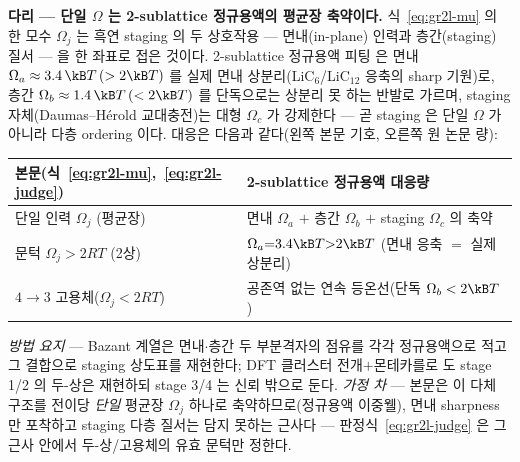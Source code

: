 \begin{srcbox}
\textbf{다리 --- 단일 $\Omega$ 는 2-sublattice 정규용액의 평균장 축약이다.} 식~\eqref{eq:gr2l-mu} 의 한 모수
$\Omega_j$ 는 흑연 staging 의 두 상호작용 --- 면내(in-plane) 인력과 층간(staging) 질서 --- 을 한 좌표로
접은 것이다. 2-sublattice 정규용액 피팅\cite{fergusonbazant2014,guo2016} 은 면내 $\Omega_a\approx3.4\,\kB
T\,(>2\kB T)$ 를 실제 면내 상분리(LiC$_6$/LiC$_{12}$ 응축의 sharp 기원)로, 층간 $\Omega_b\approx1.4\,\kB
T\,(<2\kB T)$ 를 단독으로는 상분리 못 하는 반발로 가르며, staging 자체(Daumas--H\'erold 교대충전)는 대형
$\Omega_c$ 가 강제한다 --- 곧 staging 은 단일 $\Omega$ 가 아니라 다층 ordering 이다. 대응은 다음과 같다(왼쪽
본문 기호, 오른쪽 원 논문 량):
\begin{center}\footnotesize
\begin{tabular}{@{}ll@{}}
\hline
본문(식~\eqref{eq:gr2l-mu},~\eqref{eq:gr2l-judge}) & 2-sublattice 정규용액\cite{fergusonbazant2014,guo2016} 대응량 \\
\hline
단일 인력 $\Omega_j$ (평균장) & 면내 $\Omega_a$ $+$ 층간 $\Omega_b$ $+$ staging $\Omega_c$ 의 축약 \\
문턱 $\Omega_j>2RT$ (2상) & $\Omega_a{=}3.4\kB T{>}2\kB T$ (면내 응축 $=$ 실제 상분리) \\
$4\!\to\!3$ 고용체($\Omega_j<2RT$) & 공존역 없는 연속 등온선(단독 $\Omega_b<2\kB T$) \\
\hline
\end{tabular}
\end{center}
\emph{방법 요지} --- Bazant 계열은 면내$\cdot$층간 두 부분격자의 점유를 각각 정규용액으로 적고 그 결합으로
staging 상도표를 재현한다; DFT 클러스터 전개$+$몬테카를로\cite{persson2010b} 도 stage 1/2 의 두-상은
재현하되 stage 3/4 는 신뢰 밖으로 둔다. \emph{가정 차} --- 본문은 이 다체 구조를 전이당 \emph{단일} 평균장
$\Omega_j$ 하나로 축약하므로(정규용액 이중웰), 면내 sharpness 만 포착하고 staging 다층 질서는 담지 못하는
근사다 --- 판정식~\eqref{eq:gr2l-judge} 은 그 근사 안에서 두-상/고용체의 유효 문턱만 정한다.
\end{srcbox}

